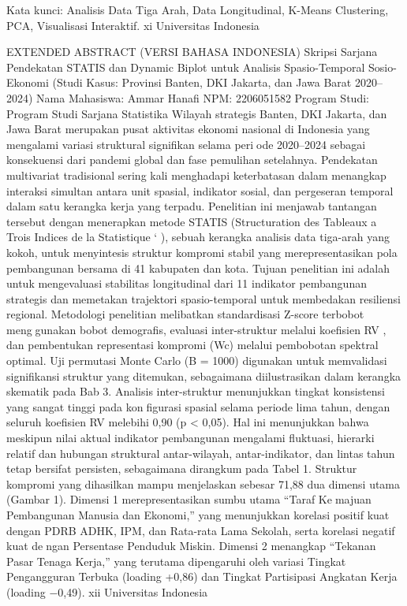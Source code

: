 Kata kunci: Analisis Data Tiga Arah, Data Longitudinal, K-Means Clustering, PCA,
Visualisasi Interaktif.
xi Universitas Indonesia

EXTENDED ABSTRACT (VERSI BAHASA INDONESIA)
Skripsi Sarjana
Pendekatan STATIS dan Dynamic Biplot untuk Analisis
Spasio-Temporal Sosio-Ekonomi (Studi Kasus: Provinsi Banten, DKI
Jakarta, dan Jawa Barat 2020–2024)
Nama Mahasiswa: Ammar Hanafi
NPM: 2206051582
Program Studi: Program Studi Sarjana Statistika
Wilayah strategis Banten, DKI Jakarta, dan Jawa Barat merupakan pusat aktivitas
ekonomi nasional di Indonesia yang mengalami variasi struktural signifikan selama periode 2020–2024 sebagai konsekuensi dari pandemi global dan fase pemulihan setelahnya.
Pendekatan multivariat tradisional sering kali menghadapi keterbatasan dalam menangkap
interaksi simultan antara unit spasial, indikator sosial, dan pergeseran temporal dalam
satu kerangka kerja yang terpadu. Penelitian ini menjawab tantangan tersebut dengan
menerapkan metode STATIS (Structuration des Tableaux a Trois Indices de la Statistique ` ),
sebuah kerangka analisis data tiga-arah yang kokoh, untuk menyintesis struktur kompromi
stabil yang merepresentasikan pola pembangunan bersama di 41 kabupaten dan kota.
Tujuan penelitian ini adalah untuk mengevaluasi stabilitas longitudinal dari 11 indikator
pembangunan strategis dan memetakan trajektori spasio-temporal untuk membedakan
resiliensi regional. Metodologi penelitian melibatkan standardisasi Z-score terbobot menggunakan bobot demografis, evaluasi inter-struktur melalui koefisien RV , dan pembentukan
representasi kompromi (Wc) melalui pembobotan spektral optimal. Uji permutasi Monte
Carlo (B = 1000) digunakan untuk memvalidasi signifikansi struktur yang ditemukan,
sebagaimana diilustrasikan dalam kerangka skematik pada Bab 3.
Analisis inter-struktur menunjukkan tingkat konsistensi yang sangat tinggi pada konfigurasi spasial selama periode lima tahun, dengan seluruh koefisien RV melebihi 0,90
(p < 0,05). Hal ini menunjukkan bahwa meskipun nilai aktual indikator pembangunan
mengalami fluktuasi, hierarki relatif dan hubungan struktural antar-wilayah, antar-indikator,
dan lintas tahun tetap bersifat persisten, sebagaimana dirangkum pada Tabel 1. Struktur
kompromi yang dihasilkan mampu menjelaskan sebesar 71,88%
dua dimensi utama (Gambar 1). Dimensi 1 merepresentasikan sumbu utama “Taraf Kemajuan Pembangunan Manusia dan Ekonomi,” yang menunjukkan korelasi positif kuat
dengan PDRB ADHK, IPM, dan Rata-rata Lama Sekolah, serta korelasi negatif kuat dengan Persentase Penduduk Miskin. Dimensi 2 menangkap “Tekanan Pasar Tenaga Kerja,”
yang terutama dipengaruhi oleh variasi Tingkat Pengangguran Terbuka (loading +0,86)
dan Tingkat Partisipasi Angkatan Kerja (loading −0,49).
xii Universitas Indonesia

